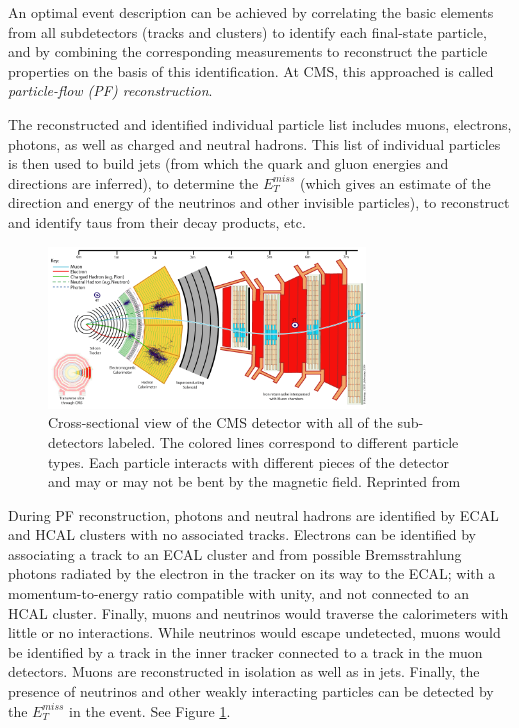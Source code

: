 An optimal event description can be achieved by correlating the basic elements from all subdetectors (tracks and clusters) to identify each final-state particle, and by combining the corresponding measurements to reconstruct the particle properties on the basis of this identification. At CMS, this approached is called \textit{particle-flow (PF) reconstruction}.

The reconstructed and identified individual particle list includes muons, electrons, photons, as well as charged  and neutral hadrons. This list of individual particles is then used to build jets (from which the quark and gluon energies and directions are inferred), to determine the $E_{T}^{miss}$ (which gives an estimate of the direction and energy of the neutrinos and other invisible particles), to reconstruct and identify taus from their decay products, etc.

 \begin{figure}[h]
 	\centering
 	\includegraphics[width=0.75\textwidth]{figures/image005.png}
 	\singlespace
 	\caption{Cross-sectional view of the CMS detector with all of the sub-detectors labeled. The colored lines correspond to different particle types. Each particle interacts with different pieces of the detector and may or may not be bent by the magnetic field. Reprinted from \cite{CMSSlice}}
  	\label{fig:cmsslice} 	
 \end{figure}

During PF reconstruction, photons and neutral hadrons are identified by ECAL and HCAL clusters with no associated tracks. Electrons can be identified by associating a track to an ECAL cluster and from possible Bremsstrahlung photons radiated by the electron in the tracker on its way to the ECAL; with a momentum-to-energy ratio compatible with unity, and not connected to an HCAL cluster. Finally, muons and neutrinos would traverse the calorimeters with little or no interactions. While neutrinos would escape undetected, muons would be identified by a track in the inner tracker connected to a track in the muon detectors. Muons are reconstructed in isolation as well as in jets. Finally, the presence of neutrinos and other weakly interacting particles can be detected by the $E_{T}^{miss}$ in the event. See Figure \ref{fig:cmsslice}.

